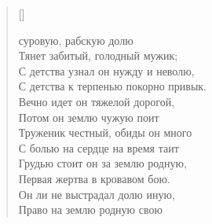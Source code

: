 \newpage
\vspace*{0cm}

\settowidth{\versewidth}{С детства к терпенью покорно привык.}
\begin{verse}[\versewidth]
\begin{patverse*}
 суровую, рабскую долю\\
Тянет забитый, голодный мужик;\\
 С детства узнал он нужду и неволю,\\
С детства к терпенью покорно привык.\\
 Вечно идет он тяжелой дорогой,\\
Потом он землю чужую поит\ldotst\\
 Труженик честный, обиды он много\\
С болью на сердце на время таит\ldotst\\
 Грудью стоит он за землю родную, \\
Первая жертва в кровавом бою.\\
 Он ли не выстрадал долю иную,\\
Право на землю родную свою\ldotsq
\end{patverse*}
\end{verse}

\newpage
\vspace*{-0.5cm}
 

